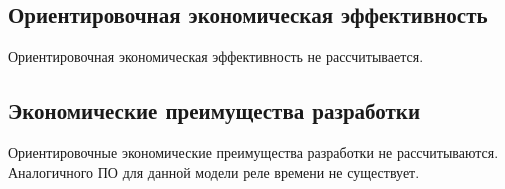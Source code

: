 \subsection{Ориентировочная экономическая эффективность}
Ориентировочная экономическая эффективность не рассчитывается.

\subsection{Экономические преимущества разработки}
Ориентировочные экономические преимущества разработки не рассчитываются. Аналогичного ПО для данной модели реле времени не существует.